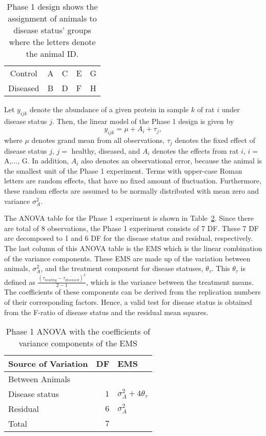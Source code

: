 \documentclass[article]{jss}
\begin{document}
\begin{table}[ht]
\centering
\caption{Phase 1 design shows the assignment of animals to disease status' groups where the letters denote the animal ID.}
\begin{tabular}[t]{ccccc}
\hline 
Control & A & C & E & G \\ 
Diseased & B & D & F & H \\ 
\hline 
\end{tabular} 
\label{tab:phase1Design}
\end{table}

Let $y_{ijk}$ denote the abundance of a given protein in sample $k$ of rat $i$ under disease status $j$. Then, the linear model of the Phase 1 design is given by
\begin{equation}\label{eq:phase1Model}
y_{ijk}= \mu + A_{i} + \tau_{j},
\end{equation}
where $\mu$ denotes grand mean from all observations, $\tau_{j}$ denotes the fixed effect of disease status $j$, $j=$ healthy, diseased, and $A_{i}$ denotes the effects from rat $i$, $i=$ A,$\dots$, G. In addition, $A_i$ also denotes an observational error, because the animal is the smallest unit of the Phase 1 experiment. Terms with upper-case Roman letters are random effects, that have no fixed amount of fluctuation. Furthermore, these random effects are assumed to be normally distributed with mean zero and variance $\sigma_{A}^2$.

The ANOVA table for the Phase 1 experiment is shown in Table~\ref{tab:Phase1ANOVA}. Since there are total of 8 observations, the Phase 1 experiment consists of 7 DF. These 7 DF are decomposed to 1 and 6 DF for the disease status and residual, respectively. The last column of this ANOVA table is the EMS which is the linear combination of the variance components. These EMS are made up of the variation between animals, $\sigma_{A}^2$, and the treatment component for disease statuses, $\theta_{\tau}$. This $\theta_{\tau}$ is defined as $\frac{(\overline{\tau_{healthy}} - \overline{\tau_{diseased}})^2}{2-1}$, which is the variance between the treatment means. The coefficients of these components can be derived from the replication numbers of their corresponding factors. Hence, a valid test for disease status is obtained from the F-ratio of disease status and the residual mean squares.

\begin{table}[ht]
\centering
\caption{Phase 1 ANOVA with the coefficients of variance components of the EMS}
\begin{tabular}[t]{lrl}
\hline
\multicolumn{1}{l}{Source of Variation} & \multicolumn{1}{l}{DF} & \multicolumn{1}{l}{EMS}\\
\hline
Between Animals 		\\
\hspace{3mm}Disease status 	& $1$ 	& $\sigma_{A}^2 + 4\theta_{\tau}$\\
\hspace{3mm}Residual		& $6$ 	& $\sigma_{A}^2$\\
\hline
Total 						& $7$      & \\
\hline
\end{tabular}
\label{tab:Phase1ANOVA}
\end{table}
\end{document}
